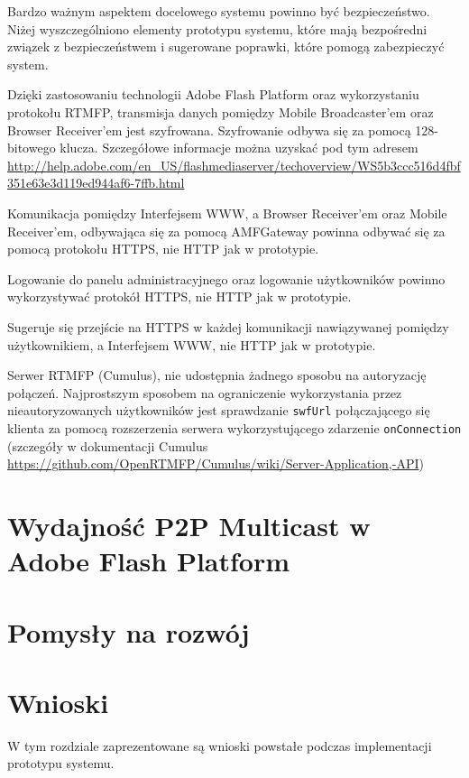 Bardzo ważnym aspektem docelowego systemu powinno być bezpieczeństwo. Niżej wyszczególniono elementy prototypu systemu, które mają bezpośredni związek z bezpieczeństwem i sugerowane poprawki, które pomogą zabezpieczyć system.

\begin{packed_item}
    \item{Dzięki zastosowaniu technologii Adobe Flash Platform oraz wykorzystaniu protokołu RTMFP, transmisja danych pomiędzy Mobile Broadcaster'em oraz Browser Receiver'em jest szyfrowana. Szyfrowanie odbywa się za pomocą 128-bitowego klucza. Szczegółowe informacje można uzyskać pod tym adresem \url{http://help.adobe.com/en_US/flashmediaserver/techoverview/WS5b3ccc516d4fbf351e63e3d119ed944af6-7ffb.html}}
    \item{Komunikacja pomiędzy Interfejsem WWW, a Browser Receiver'em oraz Mobile Receiver'em, odbywająca się za pomocą AMFGateway powinna odbywać się za pomocą protokołu HTTPS, nie HTTP jak w prototypie.}
    \item{Logowanie do panelu administracyjnego oraz logowanie użytkowników powinno wykorzystywać protokół HTTPS, nie HTTP jak w prototypie.}
    \item{Sugeruje się przejście na HTTPS w każdej komunikacji nawiązywanej pomiędzy użytkownikiem, a Interfejsem WWW, nie HTTP jak w prototypie.}
    \item{Serwer RTMFP (Cumulus), nie udostępnia żadnego sposobu na autoryzację połączeń. Najprostszym sposobem na ograniczenie wykorzystania przez nieautoryzowanych użytkowników jest sprawdzanie \texttt{swfUrl} połączającego się klienta za pomocą rozszerzenia serwera wykorzystującego zdarzenie \texttt{onConnection} (szczegóły w dokumentacji Cumulus \url{https://github.com/OpenRTMFP/Cumulus/wiki/Server-Application,-API})}
\end{packed_item}

\section{Wydajność P2P Multicast w Adobe Flash Platform}

\section{Pomysły na rozwój}

\section{Wnioski}

W tym rozdziale zaprezentowane są wnioski powstałe podczas implementacji prototypu systemu.

\newpage
